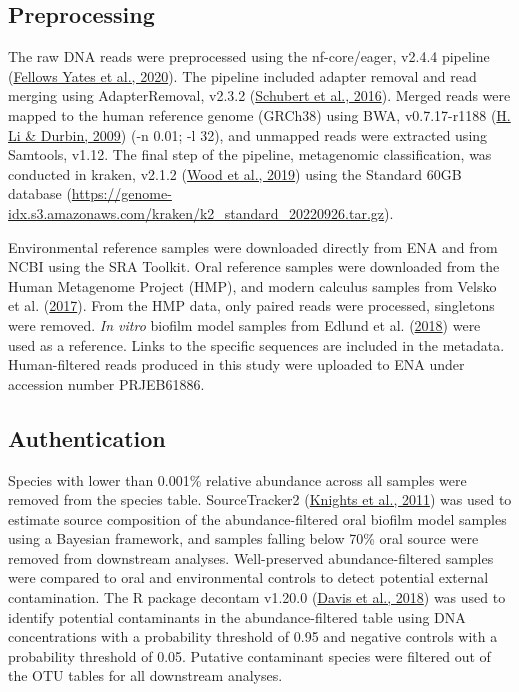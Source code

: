 \documentclass[
  letterpaper,
]{book}
\begin{document}
\hypertarget{preprocessing}{%
\subsection{Preprocessing}\label{preprocessing}}

The raw DNA reads were preprocessed using the nf-core/eager, v2.4.4
pipeline (\protect\hyperlink{ref-yatesEAGER2020}{Fellows Yates et al.,
2020}). The pipeline included adapter removal and read merging using
AdapterRemoval, v2.3.2
(\protect\hyperlink{ref-AdapterRemovalv2}{Schubert et al., 2016}).
Merged reads were mapped to the human reference genome (GRCh38) using
BWA, v0.7.17-r1188 (\protect\hyperlink{ref-BWA}{H. Li \& Durbin, 2009})
(-n 0.01; -l 32), and unmapped reads were extracted using Samtools,
v1.12. The final step of the pipeline, metagenomic classification, was
conducted in kraken, v2.1.2 (\protect\hyperlink{ref-kraken2}{Wood et
al., 2019}) using the Standard 60GB database
(\url{https://genome-idx.s3.amazonaws.com/kraken/k2_standard_20220926.tar.gz}).

Environmental reference samples were downloaded directly from ENA and
from NCBI using the SRA Toolkit. Oral reference samples were downloaded
from the Human Metagenome Project (HMP), and modern calculus samples
from Velsko et al.
(\protect\hyperlink{ref-velskoDentalCalculus2017}{2017}). From the HMP
data, only paired reads were processed, singletons were removed.
\emph{In vitro} biofilm model samples from Edlund et al.
(\protect\hyperlink{ref-edlundUncoveringComplex2018}{2018}) were used as
a reference. Links to the specific sequences are included in the
metadata. Human-filtered reads produced in this study were uploaded to
ENA under accession number PRJEB61886.

\hypertarget{authentication}{%
\subsection{Authentication}\label{authentication}}

Species with lower than 0.001\% relative abundance across all samples
were removed from the species table. SourceTracker2
(\protect\hyperlink{ref-knightsSourceTracker2011}{Knights et al., 2011})
was used to estimate source composition of the abundance-filtered oral
biofilm model samples using a Bayesian framework, and samples falling
below 70\% oral source were removed from downstream analyses.
Well-preserved abundance-filtered samples were compared to oral and
environmental controls to detect potential external contamination. The R
package decontam v1.20.0 (\protect\hyperlink{ref-Rdecontam}{Davis et
al., 2018}) was used to identify potential contaminants in the
abundance-filtered table using DNA concentrations with a probability
threshold of 0.95 and negative controls with a probability threshold of
0.05. Putative contaminant species were filtered out of the OTU tables
for all downstream analyses.
\end{document}
